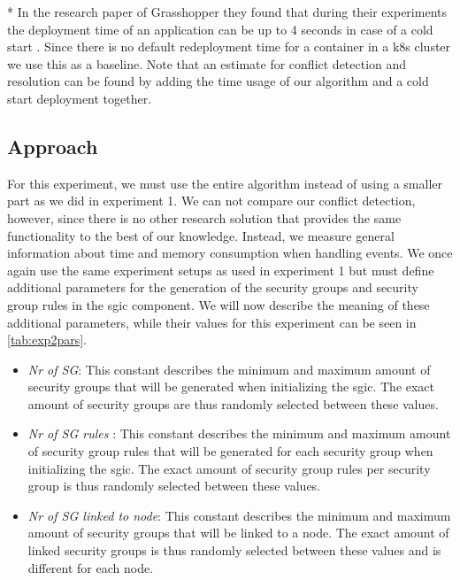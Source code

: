 * In the research paper of Grasshopper they found that during their experiments the deployment time of an application can be up to 4 seconds in case of a cold start \cite{grashopper}. Since there is no default redeployment time for a container in a \acrshort{k8s} cluster we use this as a baseline. Note that an estimate for conflict detection and resolution can be found by adding the time usage of our algorithm and a cold start deployment together.

\subsection{Approach} \label{exp2:approach}
For this experiment, we must use the entire algorithm instead of using a smaller part as we did in experiment 1. We can not compare our conflict detection, however, since there is no other research solution that provides the same functionality to the best of our knowledge. Instead, we measure general information about time and memory consumption when handling events. We once again use the same experiment setups as used in experiment 1 but must define additional parameters for the generation of the security groups and security group rules in the \acrshort{sgic} component. We will now describe the meaning of these additional parameters, while their values for this experiment can be seen in \autoref{tab:exp2pars}.

\begin{itemize}
    \item \textit{Nr of SG}: This constant describes the minimum and maximum amount of security groups that will be generated when initializing the \acrshort{sgic}. The exact amount of security groups are thus randomly selected between these values.
    \item \textit{Nr of SG rules }: This constant describes the minimum and maximum amount of security group rules that will be generated for each security group when initializing the \acrshort{sgic}. The exact amount of security group rules per security group is thus randomly selected between these values.
    \item \textit{Nr of SG linked to node}: This constant describes the minimum and maximum amount of security groups that will be linked to a node. The exact amount of linked security groups is thus randomly selected between these values and is different for each node.
\end{itemize}

